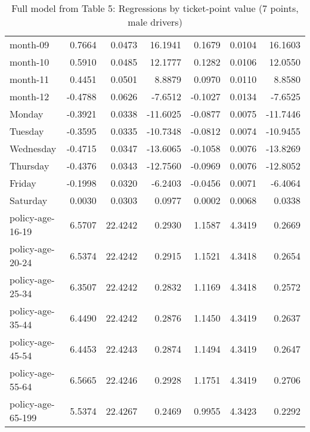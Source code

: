\documentclass[10pt]{article}
\begin{document}
\begin{table}[ht]
\begin{tabular}{lrrrrrr}
  month-09 & 0.7664 & 0.0473 & 16.1941 & 0.1679 & 0.0104 & 16.1603 \\ 
  month-10 & 0.5910 & 0.0485 & 12.1777 & 0.1282 & 0.0106 & 12.0550 \\ 
  month-11 & 0.4451 & 0.0501 & 8.8879 & 0.0970 & 0.0110 & 8.8580 \\ 
  month-12 & -0.4788 & 0.0626 & -7.6512 & -0.1027 & 0.0134 & -7.6525 \\ 
  Monday & -0.3921 & 0.0338 & -11.6025 & -0.0877 & 0.0075 & -11.7446 \\ 
  Tuesday & -0.3595 & 0.0335 & -10.7348 & -0.0812 & 0.0074 & -10.9455 \\ 
  Wednesday & -0.4715 & 0.0347 & -13.6065 & -0.1058 & 0.0076 & -13.8269 \\ 
  Thursday & -0.4376 & 0.0343 & -12.7560 & -0.0969 & 0.0076 & -12.8052 \\ 
  Friday & -0.1998 & 0.0320 & -6.2403 & -0.0456 & 0.0071 & -6.4064 \\ 
  Saturday & 0.0030 & 0.0303 & 0.0977 & 0.0002 & 0.0068 & 0.0338 \\ 
  policy-age-16-19 & 6.5707 & 22.4242 & 0.2930 & 1.1587 & 4.3419 & 0.2669 \\ 
  policy-age-20-24 & 6.5374 & 22.4242 & 0.2915 & 1.1521 & 4.3418 & 0.2654 \\ 
  policy-age-25-34 & 6.3507 & 22.4242 & 0.2832 & 1.1169 & 4.3418 & 0.2572 \\ 
  policy-age-35-44 & 6.4490 & 22.4242 & 0.2876 & 1.1450 & 4.3419 & 0.2637 \\ 
  policy-age-45-54 & 6.4453 & 22.4243 & 0.2874 & 1.1494 & 4.3419 & 0.2647 \\ 
  policy-age-55-64 & 6.5665 & 22.4246 & 0.2928 & 1.1751 & 4.3419 & 0.2706 \\ 
  policy-age-65-199 & 5.5374 & 22.4267 & 0.2469 & 0.9955 & 4.3423 & 0.2292 \\ 
   \hline
\end{tabular}
\caption{Full model from Table 5: Regressions by ticket-point value (7 points, male drivers)} 
\label{tab_5_7_pts_M}
\end{table}


\clearpage
\pagebreak



\end{document}
